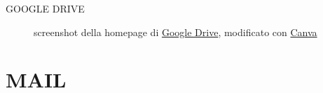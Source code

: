 \documentclass[aspectratio=1610]{beamer}
\begin{document}
\begin{frame}{GOOGLE DRIVE}
{\begin{figure}
        \caption{{screenshot della homepage di \href{https://drive.google.com}{Google Drive}}, modificato con \href{https://www.canva.com}{Canva}}
    \end{figure}}
\end{frame}

\section{MAIL}
\end{document}
